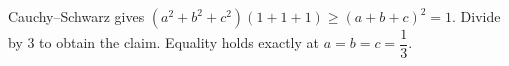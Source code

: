 Cauchy--Schwarz gives $(a^2+b^2+c^2)(1+1+1)\ge(a+b+c)^2=1$. Divide by 3 to obtain the claim. Equality holds exactly at $a=b=c=\dfrac{1}{3}$.
